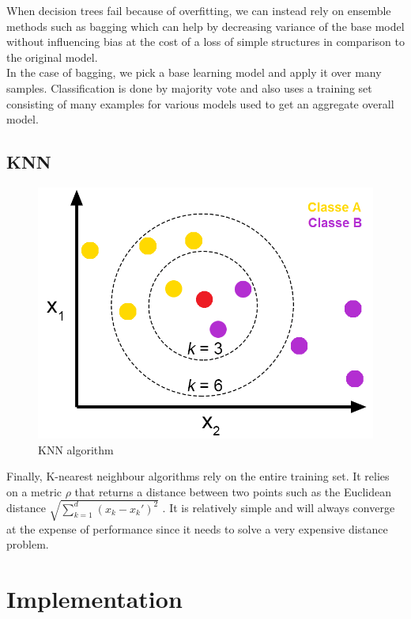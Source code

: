 \documentclass[a4paper,12pt,twoside,twocolumn]{article}
\begin{document}
When decision trees fail because of overfitting, we can instead rely on ensemble methods such as bagging which can help by decreasing variance of the base model without influencing bias at the cost of a loss of simple structures in comparison to the original model.\\

In the case of bagging, we pick a base learning model and apply it over many samples. Classification is done by majority vote and also uses a training set consisting of many examples for various models used to get an aggregate overall model.\\

\subsection{KNN}
\label{sec:org76563aa}

\begin{center}
\begin{figure}[htbp]
\centering
\includegraphics[width=.9\linewidth]{./images/knn.png}
\caption{KNN algorithm}
\end{figure}
\end{center}

Finally, K-nearest neighbour algorithms rely on the entire training set. It relies on a metric \(\rho\) that returns a distance between two points such as the Euclidean distance \(\sqrt{\sum_{k=1}^d_{}^{} (x_k - x_k')^2}\) . It is relatively simple and will always converge at the expense of performance since it needs to solve a very expensive distance problem.\\

\section{Implementation}
\label{sec:orga8e233c}
\end{document}
